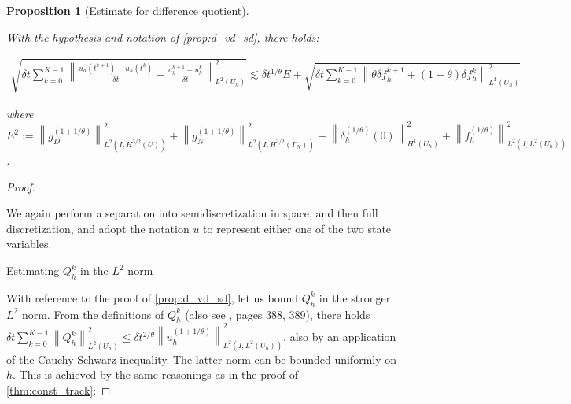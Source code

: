 \documentclass[english,a4paper,9pt,oneside]{scrbook}	%
\theoremstyle{break}
\newtheorem{prop}[equation]{Proposition}
\newenvironment{mproof}[1][\proofname]{%
  \begin{proof}[#1]$ $\par\nobreak\ignorespaces
}{%
  \end{proof}
}
\renewcommand*{\proofname}{Proof}
\theoremstyle{remark}
\newcommand{\ds}{\displaystyle}
\newcommand{\norm}[1]{\left\lVert#1\right\rVert}
\newcommand{\te}{\theta}
\begin{document}
\begin{appendices}




\begin{prop}[Estimate for difference quotient]
\label{prop:another_bound}

With the hypothesis and notation of  \cref{prop:d_vd_sd}, there holds:


\begin{align*}
	\sqrt{\delta t \sum_{k=0}^{K-1} \norm{\frac{u_h(t^{k+1})-u_h(t^k)}{\delta t} - \frac{u_h^{k+1}-u_h^{k}}{\delta t}}_{L^2(U_h)}^2}\lesssim \delta t^{1/\te}E +  \sqrt{\delta t \sum_{k=0}^{K-1}\norm{\theta \delta f_h^{k+1}+(1-\theta)\delta f_h^k}_{L^2(U_h)}^2}
\end{align*}

where $\ds E^2:=\norm{g_D^{(1+1/\te)}}_{L^2(I,{H^{3/2}(U)})}^2 + \norm{g_{N}^{(1+1/\te)}}_{L^2(I,{H^{3/2}(\Gamma_{N})})}^2 +\norm{\delta_h^{(1/\te)}(0)}_{H^1(U_h)}^2 + \norm{f_h^{(1/\te)}}^2_{L^2(I,L^2(U_h))}$.
\end{prop}

\begin{mproof}
We again perform a separation into semidiscretization in space, and then full discretization, and adopt the notation $u$ to represent either one of the two state variables.

\underline{Estimating $Q_h^k$ in the $L^2$ norm}

With reference to the proof of \cref{prop:d_vd_sd}, let us bound $Q_h^k$ in the stronger $L^2$ norm. From the definitions of $Q_h^k$ (also see \cite{quarteroni}, pages 388, 389), there holds $\delta t \sum_{k=0}^{K-1} \norm{Q_h^k}_{L^2(U_h)}^2\leq \delta t^{2/\te} \norm{u_h^{(1+1/\te)}}_{L^2(I,{L^2(U_h)})}^2$, also by an application of the Cauchy-Schwarz inequality. The latter norm can be bounded uniformly on $h$. This is achieved by the same reasonings as in the proof of \cref{thm:const_track}:


\end{mproof}
\end{appendices}
\end{document}
